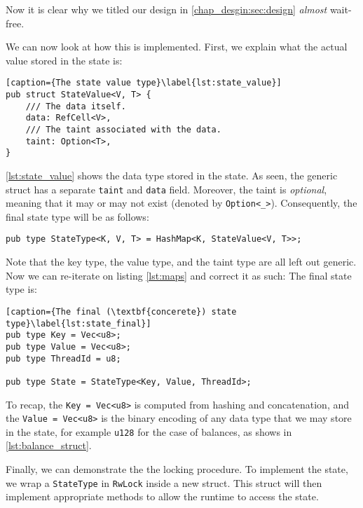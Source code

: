 \begin{remark}
	Now it is clear why we titled our design in \ref{chap_desgin:sec:design} \textit{almost}
	wait-free.
\end{remark}

We can now look at how this is implemented. First, we explain what the actual value stored in the
state is:

\begin{lstlisting}[caption={The state value type}\label{lst:state_value}]
pub struct StateValue<V, T> {
	/// The data itself.
	data: RefCell<V>,
	/// The taint associated with the data.
	taint: Option<T>,
}
\end{lstlisting}

\ref{lst:state_value} shows the data type stored in the state. As seen, the generic struct has a
separate \texttt{taint} and \texttt{data} field. Moreover, the taint is \textit{optional}, meaning
that it may or may not exist (denoted by \texttt{Option<\_>}). Consequently, the final state type
will be as follows:

\begin{lstlisting}[caption={The final \textbf{(generic}) state type}]
pub type StateType<K, V, T> = HashMap<K, StateValue<V, T>>;
\end{lstlisting}

Note that the key type, the value type, and the taint type are all left out generic. Now we can
re-iterate on listing \ref{lst:maps} and correct it as such: The final state type is:

\begin{lstlisting}[caption={The final (\textbf{concerete}) state type}\label{lst:state_final}]
pub type Key = Vec<u8>;
pub type Value = Vec<u8>;
pub type ThreadId = u8;

pub type State = StateType<Key, Value, ThreadId>;
\end{lstlisting}

To recap, the \texttt{Key = Vec<u8>} is computed from hashing and concatenation, and the
\texttt{Value = Vec<u8>} is the binary encoding of any data type that we may store in the state, for
example \texttt{u128} for the case of balances, as shows in \ref{lst:balance_struct}.

Finally, we can demonstrate the the locking procedure. To implement the state, we wrap a
\texttt{StateType} in \texttt{RwLock} inside a new struct. This struct will then implement
appropriate methods to allow the runtime to access the state.

